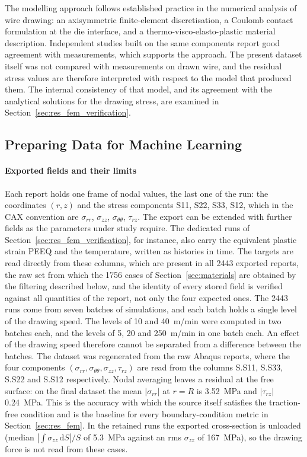 \documentclass[pdflatex,sn-basic,Numbered]{sn-jnl}
\begin{document}
The modelling approach follows established practice in the numerical analysis of wire drawing: an axisymmetric finite-element discretisation, a Coulomb contact formulation at the die interface, and a thermo-visco-elasto-plastic material description. Independent studies built on the same components \citep{shin2026accurate,he2003residual,overstam2006influence,selbmann2024residual} report good agreement with measurements, which supports the approach. The present dataset itself was not compared with measurements on drawn wire, and the residual stress values are therefore interpreted with respect to the model that produced them. The internal consistency of that model, and its agreement with the analytical solutions for the drawing stress, are examined in Section~\ref{sec:res_fem_verification}.


\subsection{Preparing Data for Machine Learning}
\label{sec:prep-data}
\label{sec:fem-dataset}


\paragraph{Exported fields and their limits}
Each report holds one frame of nodal values, the last one of the run: the coordinates $(r,z)$ and the stress components S11, S22, S33, S12, which in the CAX convention are $\sigma_{rr}$, $\sigma_{zz}$, $\sigma_{\theta\theta}$, $\tau_{rz}$. The export can be extended with further fields as the parameters under study require. The dedicated runs of Section~\ref{sec:res_fem_verification}, for instance, also carry the equivalent plastic strain PEEQ and the temperature, written as histories in time.
The targets are read directly from these columns, which are present in all 2443 exported reports, the raw set from which the 1756 cases of Section~\ref{sec:materials} are obtained by the filtering described below, and the identity of every stored field is verified against all quantities of the report, not only the four expected ones.
The 2443 runs come from seven batches of simulations, and each batch holds a single level of the drawing speed. The levels of 10 and 40~m/min were computed in two batches each, and the levels of 5, 20 and 250~m/min in one batch each. An effect of the drawing speed therefore cannot be separated from a difference between the batches.
The dataset was regenerated from the raw Abaqus reports, where the four components $(\sigma_{rr}, \sigma_{\theta\theta}, \sigma_{zz}, \tau_{rz})$ are read from the columns S.S11, S.S33, S.S22 and S.S12 respectively.
Nodal averaging leaves a residual at the free surface: on the final dataset the mean $|\sigma_{rr}|$ at $r=R$ is 3.52~MPa and $|\tau_{rz}|$ 0.24~MPa.
This is the accuracy with which the source itself satisfies the traction-free condition and is the baseline for every boundary-condition metric in Section~\ref{sec:res_fem}.
In the retained runs the exported cross-section is unloaded (median $|\int\sigma_{zz}\,\mathrm{d}S|/S$ of 5.3~MPa against an rms $\sigma_{zz}$ of 167~MPa), so the drawing force is not read from these cases.
\end{document}
